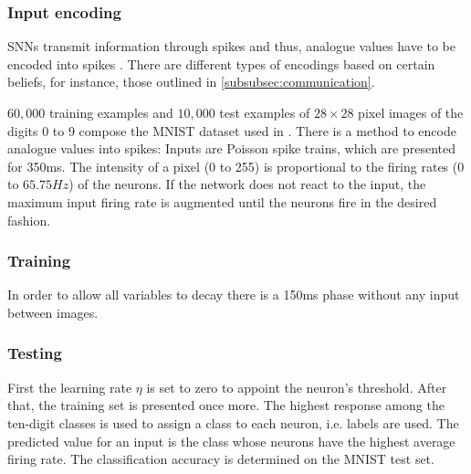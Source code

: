 \subsubsection{Input encoding}
\acp{SNN} transmit information through spikes and thus, analogue values have to be encoded into spikes \cite{DIET_SNN}.
There are different types of encodings based on certain beliefs, 
for instance, those outlined in \autoref{subsubsec:communication}.

$60,000$ training examples and $10,000$ test examples of $28\times 28$ pixel images of the digits 0 to 9 compose the MNIST dataset used in 
\cite{SNN,ANN_SNN_conversion,RBM_SNN}.
There is a method to encode analogue values into spikes:
Inputs are Poisson spike trains, which are presented for 350ms.
The intensity of a pixel (0 to 255) is proportional to the firing rates (0 to $65.75 Hz$) of the neurons.
If the network does not react to the input, the maximum input firing rate is augmented until the neurons fire in the desired fashion. 


\subsubsection{Training}
In order to allow all variables to decay there is a 150ms phase without any input between images.

\subsubsection{Testing}
First the learning rate $\eta$ is set to zero to appoint the neuron's threshold.
After that, the training set is presented once more.
The highest response among the ten-digit classes is used to assign a class to each neuron, i.e. labels are used.
The predicted value for an input is the class whose neurons have the highest average firing rate.
The classification accuracy is determined on the MNIST test set.